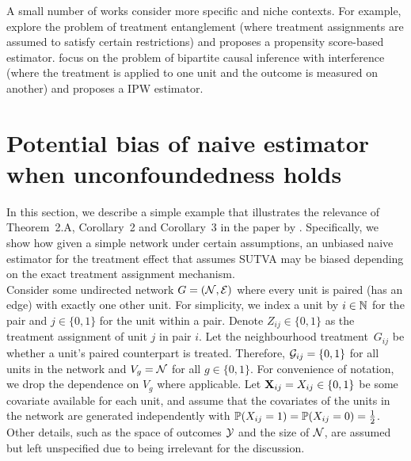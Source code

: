 \documentclass[10pt]{article}
\begin{document}
A small number of works consider more specific and niche contexts. For example, \textcite{Toulis:2018} explore the problem of treatment entanglement (where treatment assignments are assumed to satisfy certain restrictions) and proposes a propensity score-based estimator. \textcite{Zigler:2021} focus on the problem of bipartite causal inference with interference (where the treatment is applied to one unit and the outcome is measured on another) and proposes a IPW estimator.


\section{Potential bias of naive estimator when unconfoundedness holds}

\todo In this section, we describe a simple example that illustrates the relevance of Theorem~2.A, Corollary~2 and Corollary~3 in the paper by \textcite{Forastiere:2021}. Specifically, we show how given a simple network under certain assumptions, an unbiased naive estimator for the treatment effect that assumes SUTVA may be biased depending on the exact treatment assignment mechanism.
\\

Consider some undirected network $G=(\calN,\calE)$ where every unit is paired (has an edge) with exactly one other unit. For simplicity, we index a unit by $i\in\bbN$ for the pair and $j\in\{0,1\}$ for the unit within a pair. Denote $Z_{ij}\in\{0,1\}$ as the treatment assignment of unit $j$ in pair $i$. Let the neighbourhood treatment~$G_{ij}$ be whether a unit's paired counterpart is treated. Therefore, $\calG_{ij}=\{0,1\}$ for all units in the network and $V_g=\calN$ for all $g\in\{0,1\}$. For convenience of notation, we drop the dependence on $V_g$ where applicable. Let $\bfX_{ij}=X_{ij}\in\{0,1\}$ be some covariate available for each unit, and assume that the covariates of the units in the network are generated independently with $\P(X_{ij}=1)=\P(X_{ij}=0)=\frac{1}{2}$. Other details, such as the space of outcomes $\calY$ and the size of $\calN$, are assumed but left unspecified due to being irrelevant for the discussion.
\\
\end{document}
